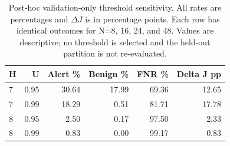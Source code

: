 \begin{table}[t]
\centering
\caption{Post-hoc validation-only threshold sensitivity. All rates are percentages and $\Delta J$ is in percentage points. Each row has identical outcomes for N=8, 16, 24, and 48. Values are descriptive; no threshold is selected and the held-out partition is not re-evaluated.}
\label{tab:validation-sensitivity}
\begingroup\fontsize{9}{10.8}\selectfont
\setlength{\tabcolsep}{3pt}
\begin{tabular}{lrrrrr}
\hline
H & U & Alert \% & Benign \% & FNR \% & Delta J pp \\
\hline
7 & 0.95 & 30.64 & 17.99 & 69.36 & 12.65 \\
7 & 0.99 & 18.29 & 0.51 & 81.71 & 17.78 \\
8 & 0.95 & 2.50 & 0.17 & 97.50 & 2.33 \\
8 & 0.99 & 0.83 & 0.00 & 99.17 & 0.83 \\
\hline
\end{tabular}
\endgroup
\end{table}
